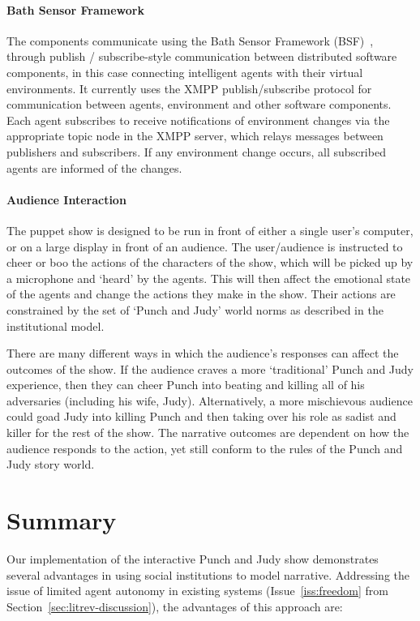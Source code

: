 \documentclass[11pt]{report}
\begin{document}
\paragraph{Bath Sensor Framework} The components communicate using the Bath Sensor Framework
(BSF)~\citep{lee2013decoupling}, through publish / subscribe-style communication between distributed software components, in this case connecting intelligent agents with their virtual environments. It currently uses the XMPP publish/subscribe protocol for communication between agents, environment and other software components. Each agent subscribes to receive notifications of environment changes via the appropriate topic node in the XMPP server, which relays messages between publishers and subscribers. If any environment change occurs, all subscribed agents are informed of the changes.

\paragraph{Audience Interaction} \label{sec:demo}
The puppet show is designed to be run in front of either a single user's computer, or on a large display in front of an audience. The user/audience is instructed to cheer or boo the actions of the characters of the show, which will be picked up by a microphone and `heard' by the agents. This will then affect the emotional state of the agents and change the actions they make in the show. Their actions are constrained by the set of `Punch and Judy' world norms as described in the institutional model.

There are many different ways in which the audience's responses can affect the outcomes of the show. If the audience craves a more `traditional' Punch and Judy experience, then they can cheer Punch into beating and killing all of his adversaries (including his wife, Judy). Alternatively, a more mischievous audience could goad Judy into killing Punch and then taking over his role as sadist and killer for the rest of the show. The narrative outcomes are dependent on how the audience responds to the action, yet still conform to the rules of the Punch and Judy story world.

\section{Summary}
\label{sec:inst-summary}
Our implementation of the interactive Punch and Judy show demonstrates several
advantages in using social institutions to model narrative. Addressing the issue
of limited agent autonomy in existing systems (Issue~\ref{iss:freedom} from
Section~\ref{sec:litrev-discussion}), the advantages of this approach are:
\end{document}
